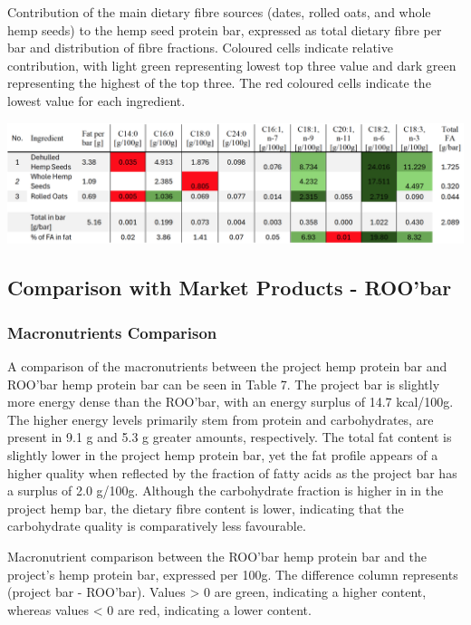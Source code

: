 \begin{table}[H]
    \centering
    \caption{Contribution of the main dietary fibre sources (dates, rolled oats, and whole hemp seeds) to the hemp seed protein bar,
    expressed as total dietary fibre per bar and distribution of fibre fractions. Coloured cells indicate relative contribution, with light
    green representing lowest top three value and dark green representing the highest of the top three. The red coloured cells indicate the
    lowest value for each ingredient.}
    \label{tab:fatty_acid_tab_01}
    \includegraphics[angle=90,origin=c,width=0.22\textheight]{Figures/tab_fatty_01.png}
\end{table}

\subsection{Comparison with Market Products - ROO'bar}
\subsubsection{Macronutrients Comparison}
A comparison of the macronutrients between the project hemp protein bar and ROO’bar hemp protein bar can be seen in Table 7. The project bar is slightly more energy dense than the ROO’bar, with an energy surplus of 14.7 kcal/100g. The higher energy levels primarily stem from protein and carbohydrates, are present in 9.1 g and 5.3 g greater amounts, respectively. The total fat content is slightly lower in the project hemp protein bar, yet the fat profile appears of a higher quality when reflected by the fraction of fatty acids as the project bar has a surplus of 2.0 g/100g. Although the carbohydrate fraction is higher in in the project hemp bar, the dietary fibre content is lower, indicating that the carbohydrate quality is comparatively less favourable. 

\vspace{1em}
Macronutrient comparison between the ROO'bar hemp protein bar and the project's hemp protein bar, expressed per 100g. The difference column represents (project bar - ROO'bar). Values > 0 are green, indicating a higher content, whereas values < 0 are red, indicating a lower content.

